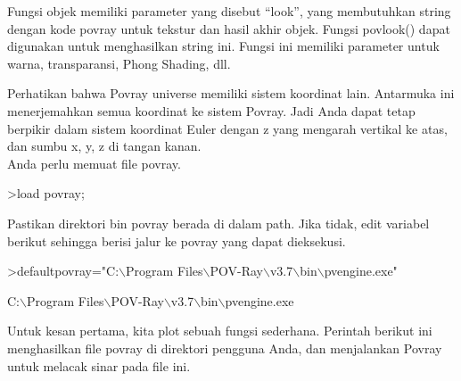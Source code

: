 \documentclass[a4paper,10pt]{article}
\begin{document}
\begin{eulernotebook}
\begin{eulercomment}
Fungsi objek memiliki parameter yang disebut “look”, yang membutuhkan
string dengan kode povray untuk tekstur dan hasil akhir objek. Fungsi
povlook() dapat digunakan untuk menghasilkan string ini. Fungsi ini
memiliki parameter untuk warna, transparansi, Phong Shading, dll.

Perhatikan bahwa Povray universe memiliki sistem koordinat lain.
Antarmuka ini menerjemahkan semua koordinat ke sistem Povray. Jadi
Anda dapat tetap berpikir dalam sistem koordinat Euler dengan z yang
mengarah vertikal ke atas, dan sumbu x, y, z di tangan kanan.\\
Anda perlu memuat file povray.
\end{eulercomment}
\begin{eulerprompt}
>load povray;
\end{eulerprompt}
\begin{eulercomment}
Pastikan direktori bin povray berada di dalam path. Jika tidak, edit
variabel berikut sehingga berisi jalur ke povray yang dapat
dieksekusi.
\end{eulercomment}
\begin{eulerprompt}
>defaultpovray="C:\(\backslash\)Program Files\(\backslash\)POV-Ray\(\backslash\)v3.7\(\backslash\)bin\(\backslash\)pvengine.exe"
\end{eulerprompt}
\begin{euleroutput}
  C:\(\backslash\)Program Files\(\backslash\)POV-Ray\(\backslash\)v3.7\(\backslash\)bin\(\backslash\)pvengine.exe
\end{euleroutput}
\begin{eulercomment}
Untuk kesan pertama, kita plot sebuah fungsi sederhana. Perintah
berikut ini menghasilkan file povray di direktori pengguna Anda, dan
menjalankan Povray untuk melacak sinar pada file ini.


\end{eulercomment}
\end{eulernotebook}
\end{document}
